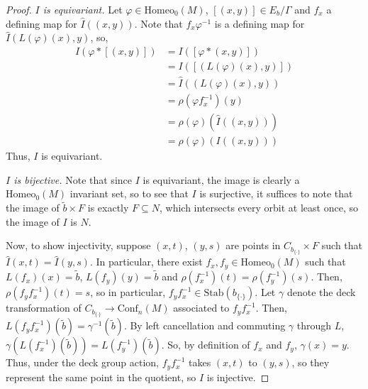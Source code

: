 \documentclass[10pt, oneside]{article}
\newcommand{\homeo}[1][S^1]{\text{Homeo}_0(#1)}
\newcommand{\conf}[2][S^1]{\text{Conf}_{#2}(#1)}
\newcommand{\set}{{\{\cdot\}}}
\newcommand{\stab}[1]{\text{Stab}(#1)}
\newcommand{\maxcov}{C_{b_\set}}
\theoremstyle{definition}
\theoremstyle{definition}
\begin{document}
\begin{proof}
    \medskip
    {\it $I$ is equivariant.}
    Let $\varphi\in\homeo[M]$, $[(x,y)]\in E_b/\Gamma$ and $f_x$ a defining map for $\hat{I}((x,y))$. Note that $f_x\varphi^{-1}$ is a defining map for $\hat{I}(L(\varphi)(x), y)$, so,
    \begin{align*}
        I(\varphi*[(x,y)]) &= I([\varphi*(x, y)]) \\
                        &= I([(L(\varphi)(x), y)]) \\
                        &= \hat{I}((L(\varphi)(x), y)) \\
                        &= \rho(\varphi f_x^{-1})(y) \\
                        &= \rho(\varphi)(\hat{I}((x,y))) \\
                        &= \rho(\varphi)(I((x, y)))
    \end{align*}
    Thus, $I$ is equivariant.

    \medskip
    {\it $I$ is bijective.} Note that since $I$ is equivariant, the image is clearly a $\homeo[M]$ invariant set, so to see that $I$ is surjective, it suffices to note that the image of ${\tilde{b}}\times F$ is exactly $F\subseteq N$, which intersects every orbit at least once, so the image of $I$ is $N$.

    Now, to show injectivity, suppose $(x,t)$, $(y, s)$ are points in $\maxcov\times F$ such that $\hat{I}(x,t) = \hat{I}(y, s)$. In particular, there exist $f_x, f_y\in\homeo[M]$ such that $L(f_x)(x) = \tilde{b}$, $L(f_y)(y) = \tilde{b}$ and $\rho(f_x^{-1})(t) = \rho(f_y^{-1})(s)$. Then, $\rho(f_y f_x^{-1})(t)= s$, so in particular, $f_y f_x^{-1}\in\stab{b_{\set}}$. Let $\gamma$ denote the deck transformation of $\maxcov\to\conf[M]{n}$ associated to $f_y f_x^{-1}$. Then, $L(f_y f_x^{-1})(\tilde{b}) = \gamma^{-1}(\tilde{b})$. By left cancellation and commuting $\gamma$ through $L$, $\gamma(L(f_x^{-1})(\tilde{b})) = L(f_y^{-1})(\tilde{b})$. So, by definition of $f_x$ and $f_y$, $\gamma(x) = y$. Thus, under the deck group action, $f_y f_x^{-1}$ takes $(x, t)$ to $(y, s)$, so they represent the same point in the quotient, so $I$ is injective.


\end{proof}
\end{document}
